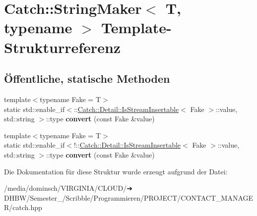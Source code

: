\hypertarget{structCatch_1_1StringMaker}{}\section{Catch\+:\+:String\+Maker$<$ T, typename $>$ Template-\/\+Strukturreferenz}
\label{structCatch_1_1StringMaker}
\subsection*{Öffentliche, statische Methoden}
\begin{DoxyCompactItemize}
\item 
\mbox{\label{structCatch_1_1StringMaker_ab2c357e22b754802c4b1351257103eb6}} 
{\footnotesize template$<$typename Fake  = T$>$ }\\static std\+::enable\+\_\+if$<$\+::\hyperlink{classCatch_1_1Detail_1_1IsStreamInsertable}{Catch\+::\+Detail\+::\+Is\+Stream\+Insertable}$<$ Fake $>$\+::value, std\+::string $>$\+::type {\bfseries convert} (const Fake \&value)
\item 
\mbox{\label{structCatch_1_1StringMaker_a68bb548de0e5ad364228b1ca3dd2f561}} 
{\footnotesize template$<$typename Fake  = T$>$ }\\static std\+::enable\+\_\+if$<$!\+::\hyperlink{classCatch_1_1Detail_1_1IsStreamInsertable}{Catch\+::\+Detail\+::\+Is\+Stream\+Insertable}$<$ Fake $>$\+::value, std\+::string $>$\+::type {\bfseries convert} (const Fake \&value)
\end{DoxyCompactItemize}


Die Dokumentation für diese Struktur wurde erzeugt aufgrund der Datei\+:\begin{DoxyCompactItemize}
\item 
/media/dominsch/\+V\+I\+R\+G\+I\+N\+I\+A/\+C\+L\+O\+U\+D/➔ D\+H\+B\+W/\+Semester\+\_/\+Scribble/\+Programmieren/\+P\+R\+O\+J\+E\+C\+T/\+C\+O\+N\+T\+A\+C\+T\+\_\+\+M\+A\+N\+A\+G\+E\+R/catch.\+hpp\end{DoxyCompactItemize}
